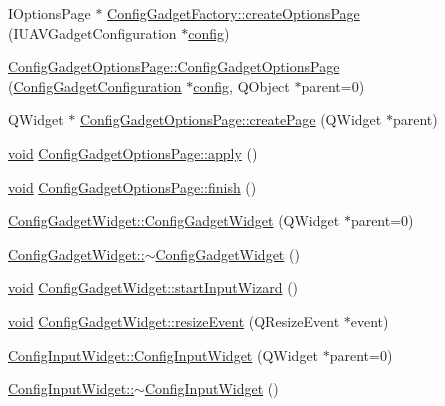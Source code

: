 \begin{DoxyCompactItemize}
\item 
I\-Options\-Page $\ast$ \hyperlink{group___config_plugin_ga371219573cd1b14bbc5d533577281f7b}{Config\-Gadget\-Factory\-::create\-Options\-Page} (I\-U\-A\-V\-Gadget\-Configuration $\ast$\hyperlink{deflate_8c_a4473b5227787415097004fd39f55185e}{config})
\item 
\hyperlink{group___config_plugin_ga2d5af20878472037582f441a56bca28c}{Config\-Gadget\-Options\-Page\-::\-Config\-Gadget\-Options\-Page} (\hyperlink{class_config_gadget_configuration}{Config\-Gadget\-Configuration} $\ast$\hyperlink{deflate_8c_a4473b5227787415097004fd39f55185e}{config}, Q\-Object $\ast$parent=0)
\item 
Q\-Widget $\ast$ \hyperlink{group___config_plugin_ga28c537e8f2468debe3c869bda53fd6c9}{Config\-Gadget\-Options\-Page\-::create\-Page} (Q\-Widget $\ast$parent)
\item 
\hyperlink{group___u_a_v_objects_plugin_ga444cf2ff3f0ecbe028adce838d373f5c}{void} \hyperlink{group___config_plugin_gab4d162de9174c38e3567e117a5b5c70f}{Config\-Gadget\-Options\-Page\-::apply} ()
\item 
\hyperlink{group___u_a_v_objects_plugin_ga444cf2ff3f0ecbe028adce838d373f5c}{void} \hyperlink{group___config_plugin_gae12bea8fac88d0fd0b9d3c95b0e62472}{Config\-Gadget\-Options\-Page\-::finish} ()
\item 
\hyperlink{group___config_plugin_gafc45c197f2917c39166b7d228d592784}{Config\-Gadget\-Widget\-::\-Config\-Gadget\-Widget} (Q\-Widget $\ast$parent=0)
\item 
\hyperlink{group___config_plugin_gaeafab35f30d35ed548cda276953b8ad5}{Config\-Gadget\-Widget\-::$\sim$\-Config\-Gadget\-Widget} ()
\item 
\hyperlink{group___u_a_v_objects_plugin_ga444cf2ff3f0ecbe028adce838d373f5c}{void} \hyperlink{group___config_plugin_ga8655bea31bbed90a46bacb2f428301f6}{Config\-Gadget\-Widget\-::start\-Input\-Wizard} ()
\item 
\hyperlink{group___u_a_v_objects_plugin_ga444cf2ff3f0ecbe028adce838d373f5c}{void} \hyperlink{group___config_plugin_ga62d98ed212936a33d9e9240f27aa7497}{Config\-Gadget\-Widget\-::resize\-Event} (Q\-Resize\-Event $\ast$event)
\item 
\hyperlink{group___config_plugin_ga5453669d3da8b5752b88e14cfca3ba03}{Config\-Input\-Widget\-::\-Config\-Input\-Widget} (Q\-Widget $\ast$parent=0)
\item 
\hyperlink{group___config_plugin_gaa2ae4d78db5c283094de22747cd958b8}{Config\-Input\-Widget\-::$\sim$\-Config\-Input\-Widget} ()

\end{DoxyCompactItemize}
